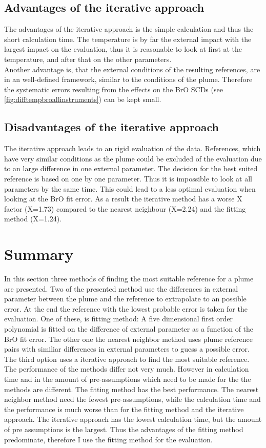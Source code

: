 \documentclass  [
  paper    = a4,
  BCOR     = 10mm,
  twoside,
  fontsize = 12pt,
  fleqn,
  toc      = bibnumbered,
  toc      = listofnumbered,
  numbers  = noendperiod,
  headings = normal,
  listof   = leveldown,
  version  = 3.03
]                                       {scrreprt}
\begin{document}
	\subsection*{Advantages of the iterative approach}
	The advantages of the iterative approach is the simple calculation and thus the short calculation time. The temperature is by far the external impact with the largest impact on the evaluation, thus it is reasonable to look at first at the temperature, and after that on the other parameters. \\
	Another advantage is, that the external conditions of the resulting references, are in an well-defined framework, similar to the  conditions of the plume. Therefore the systematic errors resulting from the effects on the BrO SCDs (see \cref{fig:difftempbroallinstruments}) can be kept small.
	\subsection*{Disadvantages of the iterative approach}
	The iterative approach leads to an rigid evaluation of the data. References, which have very similar conditions as the plume could be excluded of the evaluation due to an large difference in one external parameter. The decision for the best suited reference is based on one by one parameter. Thus it is impossible to look at all parameters by the same time.   This could lead to a less optimal evaluation when looking at the BrO fit error.
	As a result the iterative method has a worse X factor (X=1.73) compared to the nearest neighbour (X=2.24) and the fitting method (X=1.24).
	
	
\section*{Summary}	
In this section three methods of finding the most suitable reference for a plume are presented.
Two of the presented method use the differences in external parameter between the plume and the reference to extrapolate to an possible error. At the end the reference with the lowest probable error is taken for the evaluation. One of these, is fitting method: A five dimensional first order polynomial is fitted on the difference of external parameter as a function of the BrO fit error. The other one the nearest neighbor method uses plume reference pairs with similiar differences in external parameters to guess a possible error. The third option uses a iterative approach to find the most suitable reference. The performance of the methods differ not very much. However in calculation time and in the amount of pre-assumptions which need to be made for the the methods are different. The fitting method has the best performance. The nearest neighbor method need the fewest pre-assumptions, while the calculation time and the performance is much worse than for the fitting method and the iterative approach. The iterative approach has the lowest calculation time, but the amount of pre assumptions is the largest. Thus the advantages of the fitting method predominate, therefore I use the fitting method for the evaluation.
\end{document}
